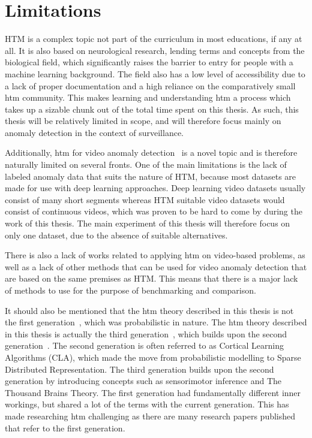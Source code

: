 \section{Limitations}
HTM is a complex topic not part of the curriculum in most educations, if any at all. It is also based on neurological research, lending terms and concepts from the biological field, which significantly raises the barrier to entry for people with a machine learning background. The field also has a low level of accessibility due to a lack of proper documentation and a high reliance on the comparatively small \gls*{htm} community. This makes learning and understanding \gls*{htm} a process which takes up a sizable chunk out of the total time spent on this thesis. As such, this thesis will be relatively limited in scope, and will therefore focus mainly on anomaly detection in the context of surveillance.
\par
Additionally, \gls*{htm} for video anomaly detection~\cite{MotionAnomalyDetection} is a novel topic and is therefore naturally limited on several fronts. One of the main limitations is the lack of labeled anomaly data that suits the nature of HTM, because most datasets are made for use with deep learning approaches. Deep learning video datasets usually consist of many short segments whereas HTM suitable video datasets would consist of continuous videos, which was proven to be hard to come by during the work of this thesis. The main experiment of this thesis will therefore focus on only one dataset, due to the absence of suitable alternatives.
\par
There is also a lack of works related to applying \gls*{htm} on video-based problems, as  well as a lack of other methods that can be used for video anomaly detection that are based on the same premises as HTM. This means that there is a major lack of methods to use for the purpose of benchmarking and comparison.
\par
It should also be mentioned that the \gls*{htm} theory described in this thesis is not the first generation~\cite{htm_zeta1}, which was probabilistic in nature. The \gls*{htm} theory described in this thesis is actually the third generation~\cite{htm_gen3, thousandbrains}, which builds upon the second generation~\cite{htm_gen2_sp,htm_gen2_tm}. The second generation is often referred to as Cortical Learning Algorithms (CLA), which made the move from probabilistic modelling to Sparse Distributed Representation. The third generation builds upon the second generation by introducing concepts such as sensorimotor inference and The Thousand Brains Theory. The first generation had fundamentally different inner workings, but shared a lot of the terms with the current generation. This has made researching  \gls*{htm} challenging as there are many research papers published that refer to the first generation.
